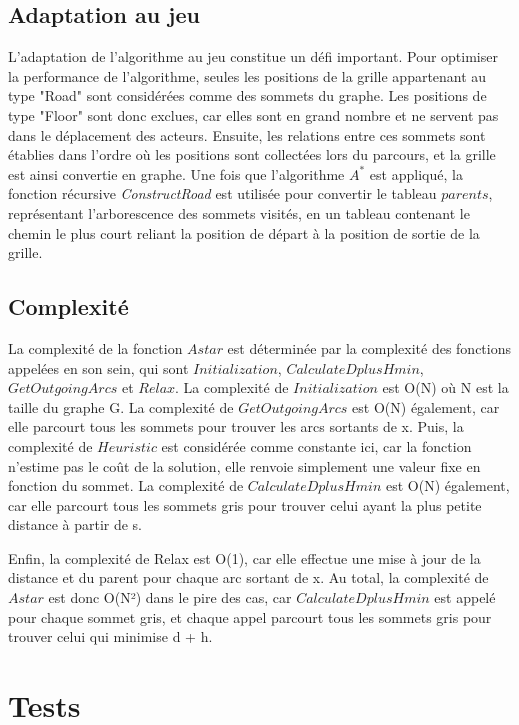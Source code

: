 \documentclass[11pt]{article}
\begin{document}
        \subsection{Adaptation au jeu}
            L'adaptation de l'algorithme au jeu constitue un défi important. Pour optimiser la performance de l'algorithme, seules les positions de la grille appartenant au type "Road" sont considérées comme des sommets du graphe. Les positions de type "Floor" sont donc exclues, car elles sont en grand nombre et ne servent pas dans le déplacement des acteurs. Ensuite, les relations entre ces sommets sont établies dans l'ordre où les positions sont collectées lors du parcours, et la grille est ainsi convertie en graphe. Une fois que l'algorithme $A^{*}$ est appliqué, la fonction récursive \textit{ConstructRoad} est utilisée pour convertir le tableau $parents$, représentant l'arborescence des sommets visités, en un tableau contenant le chemin le plus court reliant la position de départ à la position de sortie de la grille.
        \subsection{Complexité}
            
        La complexité de la fonction $Astar$ est déterminée par la complexité des fonctions appelées en son sein, qui sont $Initialization$, $CalculateDplusHmin$, $GetOutgoingArcs$ et $Relax$.
        La complexité de $Initialization$ est O(N) où N est la taille du graphe G. La complexité de $GetOutgoingArcs$ est O(N) également, car elle parcourt tous les sommets pour trouver les arcs sortants de x. Puis, la complexité de $Heuristic$ est considérée comme constante ici, car la fonction n'estime pas le coût de la solution, elle renvoie simplement une valeur fixe en fonction du sommet. La complexité de $CalculateDplusHmin$ est O(N) également, car elle parcourt tous les sommets gris pour trouver celui ayant la plus petite distance à partir de s.
        
        Enfin, la complexité de Relax est O(1), car elle effectue une mise à jour de la distance et du parent pour chaque arc sortant de x. Au total, la complexité de $Astar$ est donc O(N²) dans le pire des cas, car $CalculateDplusHmin$ est appelé pour chaque sommet gris, et chaque appel parcourt tous les sommets gris pour trouver celui qui minimise d + h.
    \section{Tests}
\end{document}
